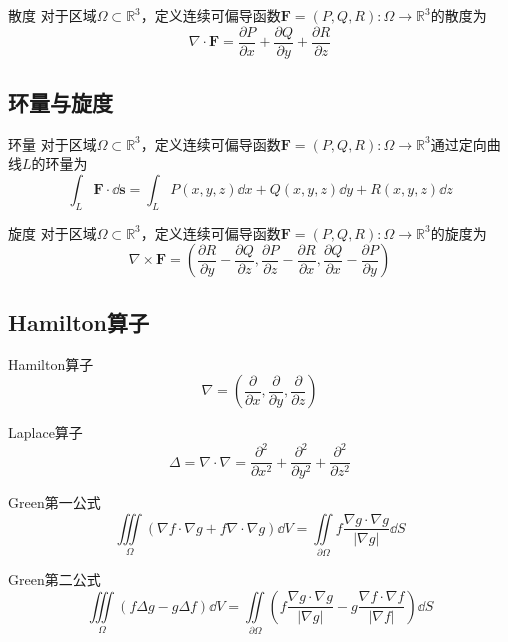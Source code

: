 \documentclass[lang = cn, scheme = chinese, thmcnt = section]{elegantbook}
\newcommand{\R}{\mathbb{R}}            %
\newcommand{\sub}{\subset}             %
\newcommand{\bs}{\boldsymbol}          %
\newcommand{\IInt}{\iint\limits}
\newcommand{\IIInt}{\iiint\limits}
\begin{document}
\begin{definition}{散度}
	对于区域$\Omega\sub\R^3$，定义连续可偏导函数$\bs{F}=(P,Q,R):\Omega\to\R^3$的散度为
	$$
	\nabla\cdot \bs{F}=\frac{\partial P}{\partial x}+\frac{\partial Q}{\partial y}+\frac{\partial R}{\partial z}
	$$
\end{definition}

\subsection{环量与旋度}

\begin{definition}{环量}
	对于区域$\Omega\sub\R^3$，定义连续可偏导函数$\bs{F}=(P,Q,R):\Omega\to\R^3$通过定向曲线$L$的环量为
	$$
	\int_L \bs{F}\cdot \dd \bs{s}=
	\int_L P(x,y,z)\dd x+Q(x,y,z)\dd y+R(x,y,z)\dd z
	$$
\end{definition}

\begin{definition}{旋度}
	对于区域$\Omega\sub\R^3$，定义连续可偏导函数$\bs{F}=(P,Q,R):\Omega\to\R^3$的旋度为
	$$
	\nabla\times \bs{F}=
	\left(
	\frac{\partial R}{\partial y}-\frac{\partial Q}{\partial z},
	\frac{\partial P}{\partial z}-\frac{\partial R}{\partial x},
	\frac{\partial Q}{\partial x}-\frac{\partial P}{\partial y}
	\right)
	$$
\end{definition}

\subsection{Hamilton算子}

\begin{definition}{Hamilton算子}
	$$
	\nabla=\left(\frac{\partial}{\partial x},\frac{\partial}{\partial y},\frac{\partial}{\partial z}\right)
	$$
\end{definition}

\begin{definition}{Laplace算子}
	$$
	\Delta
	=\nabla\cdot\nabla
	=\frac{\partial^2}{\partial x^2}+\frac{\partial^2}{\partial y^2}+\frac{\partial^2}{\partial z^2}
	$$
\end{definition}

\begin{theorem}{Green第一公式}
	$$
	\IIInt_\Omega(\nabla f\cdot\nabla g+f\nabla \cdot\nabla g)\dd V
	=\IInt_{\partial\Omega}f\frac{\nabla g\cdot\nabla g}{|\nabla g|}\dd S
	$$
\end{theorem}

\begin{theorem}{Green第二公式}
	$$
	\IIInt_\Omega(f\Delta g-g\Delta f)\dd V
	=\IInt_{\partial\Omega}\left(f\frac{\nabla g\cdot\nabla g}{|\nabla g|}-g\frac{\nabla f\cdot\nabla f}{|\nabla f|}\right)\dd S
	$$
\end{theorem}
\end{document}
